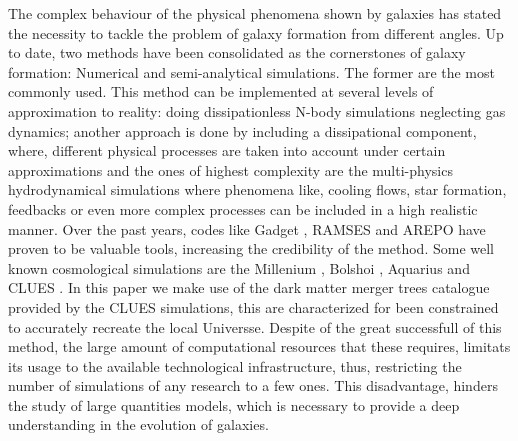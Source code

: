 \documentclass[usenatbib]{mn2e}
\begin{document}
The complex behaviour of the physical phenomena shown by galaxies has stated the necessity to tackle the problem of galaxy formation from different angles. Up to date, two methods have been
consolidated as the cornerstones of galaxy formation: Numerical and semi-analytical simulations. 
The former are the most commonly used. This method can be implemented at several levels of approximation to reality:  doing dissipationless N-body simulations neglecting gas dynamics; another approach is done by including a dissipational component, where, different physical processes are taken into account
under certain approximations and the ones of highest complexity are the multi-physics hydrodynamical simulations where phenomena like, cooling flows, star formation, feedbacks or even more complex processes can be included in a high realistic manner. 
Over the past years, codes like Gadget \citep{2005MNRAS.364.1105S}, RAMSES \citep{2002A&A...385..337T} and AREPO \citep{2010MNRAS.401..791S} have proven to be valuable tools, increasing the credibility of 
the method. Some well known cosmological simulations are the Millenium \citep{2005Natur.435..629S}, Bolshoi \citep{2011ApJ...740..102K}, Aquarius \citep{2008MNRAS.391.1685S} and CLUES 
\citep{2010arXiv1005.2687G}. In this paper we make use of the dark matter merger trees catalogue provided by the CLUES simulations, this are characterized for been constrained to 
accurately recreate the local Universse. Despite of the great successfull of this method, the large amount of computational resources that these requires, limitats its usage to the 
available technological infrastructure, thus, restricting the number of simulations of any research to a few ones. This disadvantage, hinders the study of large quantities models,
 which is necessary to provide a deep understanding in the evolution of galaxies. 
\end{document}

